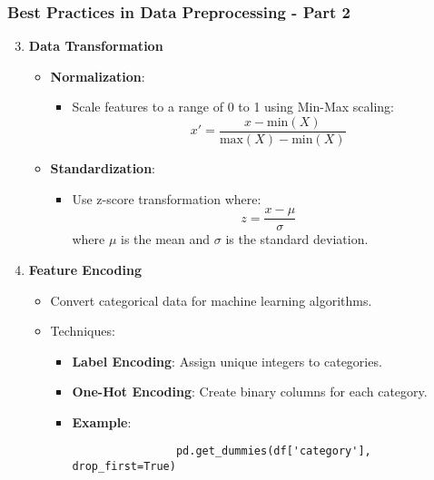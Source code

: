 \documentclass[aspectratio=169]{beamer}
\begin{document}
\begin{frame}[fragile]
    \frametitle{Best Practices in Data Preprocessing - Part 2}
    \begin{enumerate}
        \setcounter{enumi}{2}
        \item \textbf{Data Transformation}
        \begin{itemize}
            \item \textbf{Normalization}:
            \begin{itemize}
                \item Scale features to a range of 0 to 1 using Min-Max scaling:
                \begin{equation}
                x' = \frac{x - \text{min}(X)}{\text{max}(X) - \text{min}(X)}
                \end{equation}
            \end{itemize}
            \item \textbf{Standardization}:
            \begin{itemize}
                \item Use z-score transformation where:
                \begin{equation}
                z = \frac{x - \mu}{\sigma}
                \end{equation}
                where $\mu$ is the mean and $\sigma$ is the standard deviation.
            \end{itemize}
        \end{itemize}
        \item \textbf{Feature Encoding}
        \begin{itemize}
            \item Convert categorical data for machine learning algorithms.
            \item Techniques:
            \begin{itemize}
                \item \textbf{Label Encoding}: Assign unique integers to categories.
                \item \textbf{One-Hot Encoding}: Create binary columns for each category.
                \item \textbf{Example}:
                \begin{lstlisting}
                pd.get_dummies(df['category'], drop_first=True)
                \end{lstlisting}
            \end{itemize}
        \end{itemize}
    \end{enumerate}
\end{frame}
\end{document}
